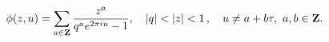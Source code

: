 \begin{equation}
\phi(z,u)=\sum_{a\in{\bf Z}} \frac{z^a  }
{q^a e^{2\pi i  u }-1}, \quad |q|<|z|<1\,, \quad u\neq a+b\tau,~
a,b\in{\bf Z}.
\label{Ser2}
\end{equation}

